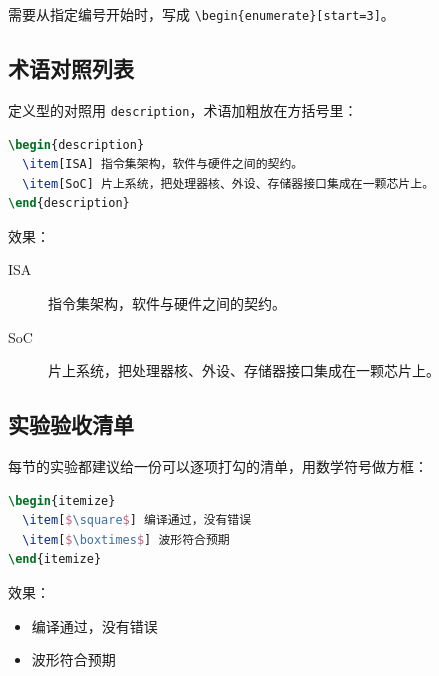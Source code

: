 需要从指定编号开始时，写成 \verb|\begin{enumerate}[start=3]|。

\subsection{术语对照列表}

定义型的对照用 \texttt{description}，术语加粗放在方括号里：

\begin{lstlisting}[language=TeX]
\begin{description}
  \item[ISA] 指令集架构，软件与硬件之间的契约。
  \item[SoC] 片上系统，把处理器核、外设、存储器接口集成在一颗芯片上。
\end{description}
\end{lstlisting}

效果：

\begin{description}
  \item[ISA] 指令集架构，软件与硬件之间的契约。
  \item[SoC] 片上系统，把处理器核、外设、存储器接口集成在一颗芯片上。
\end{description}

\subsection{实验验收清单}

每节的实验都建议给一份可以逐项打勾的清单，用数学符号做方框：

\begin{lstlisting}[language=TeX]
\begin{itemize}
  \item[$\square$] 编译通过，没有错误
  \item[$\boxtimes$] 波形符合预期
\end{itemize}
\end{lstlisting}

效果：

\begin{itemize}
  \item[$\square$] 编译通过，没有错误
  \item[$\boxtimes$] 波形符合预期
\end{itemize}
